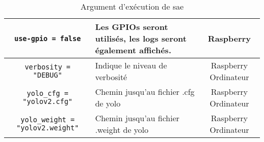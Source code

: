 \begin{table}[H]
\begin{tabularx}{\linewidth}{|c|X|c|}
        \texttt{use-gpio = false}               & Les GPIOs seront utilisés, les logs seront également affichés.                                                               & Raspberry            \\\hline
        \texttt{verbosity = "DEBUG"}            & Indique le niveau de verbosité                                                                                               & Raspberry Ordinateur \\\hline
        \texttt{yolo\_cfg = "yolov2.cfg"}       & Chemin jusqu'au fichier .cfg de yolo                                                                                         & Raspberry Ordinateur \\\hline
        \texttt{yolo\_weight = "yolov2.weight"} & Chemin jusqu'au fichier .weight de yolo                                                                                      & Raspberry Ordinateur \\\hline
    \end{tabularx}
    \label{tab:tomlClearway}
    \caption{Argument d'exécution de \gls{sae}}
\end{table}
